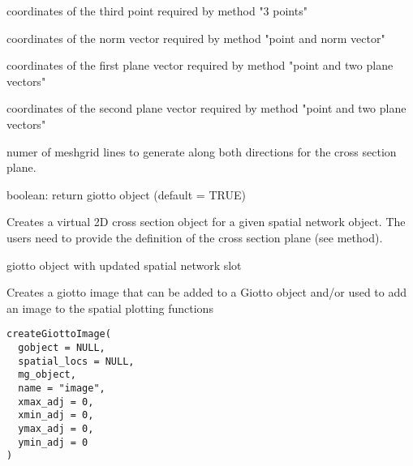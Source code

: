 \documentclass[a4paper]{book}
\begin{document}
\begin{Arguments}
\begin{ldescription}
\item[\code{point3}] coordinates of the third point required by method "3 points"

\item[\code{normVector}] coordinates of the norm vector required by method "point and norm vector"

\item[\code{planeVector1}] coordinates of the first plane vector required by method "point and two plane vectors"

\item[\code{planeVector2}] coordinates of the second plane vector required by method "point and two plane vectors"

\item[\code{mesh\_grid\_n}] numer of meshgrid lines to generate along both directions for the cross section plane.

\item[\code{return\_gobject}] boolean: return giotto object (default = TRUE)
\end{ldescription}
\end{Arguments}
%
\begin{Details}\relax
Creates a virtual 2D cross section object for a given spatial network object. The users need to provide the definition of the cross section plane (see method).
\end{Details}
%
\begin{Value}
giotto object with updated spatial network slot
\end{Value}
%
\begin{Description}\relax
Creates a giotto image that can be added to a Giotto object and/or used to add an image to the spatial plotting functions
\end{Description}
%
\begin{Usage}
\begin{verbatim}
createGiottoImage(
  gobject = NULL,
  spatial_locs = NULL,
  mg_object,
  name = "image",
  xmax_adj = 0,
  xmin_adj = 0,
  ymax_adj = 0,
  ymin_adj = 0
)
\end{verbatim}
\end{Usage}
%
\end{document}
